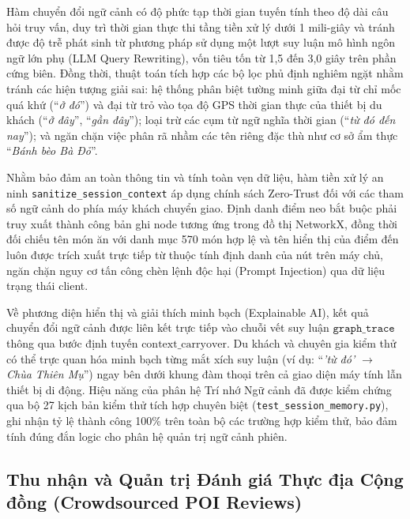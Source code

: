 Hàm chuyển đổi ngữ cảnh có độ phức tạp thời gian tuyến tính theo độ dài câu hỏi truy vấn, duy trì thời gian thực thi tầng tiền xử lý dưới 1 mili-giây và tránh được độ trễ phát sinh từ phương pháp sử dụng một lượt suy luận mô hình ngôn ngữ lớn phụ (LLM Query Rewriting), vốn tiêu tốn từ 1,5 đến 3,0 giây trên phần cứng biên. Đồng thời, thuật toán tích hợp các bộ lọc phủ định nghiêm ngặt nhằm tránh các hiện tượng giải sai: hệ thống phân biệt tường minh giữa đại từ chỉ mốc quá khứ (``\textit{ở đó}'') và đại từ trỏ vào tọa độ GPS thời gian thực của thiết bị du khách (``\textit{ở đây}'', ``\textit{gần đây}''); loại trừ các cụm từ ngữ nghĩa thời gian (``\textit{từ đó đến nay}''); và ngăn chặn việc phân rã nhầm các tên riêng đặc thù như cơ sở ẩm thực ``\textit{Bánh bèo Bà Đỏ}''.

Nhằm bảo đảm an toàn thông tin và tính toàn vẹn dữ liệu, hàm tiền xử lý an ninh \texttt{sanitize\_\allowbreak session\_\allowbreak context} áp dụng chính sách Zero-Trust đối với các tham số ngữ cảnh do phía máy khách chuyển giao. Định danh điểm neo bắt buộc phải truy xuất thành công bản ghi node tương ứng trong đồ thị NetworkX, đồng thời đối chiếu tên món ăn với danh mục 570 món hợp lệ và tên hiển thị của điểm đến luôn được trích xuất trực tiếp từ thuộc tính định danh của nút trên máy chủ, ngăn chặn nguy cơ tấn công chèn lệnh độc hại (Prompt Injection) qua dữ liệu trạng thái client.

Về phương diện hiển thị và giải thích minh bạch (Explainable AI), kết quả chuyển đổi ngữ cảnh được liên kết trực tiếp vào chuỗi vết suy luận $\texttt{graph\_trace}$ thông qua bước định tuyến $\text{context\_carryover}$. Du khách và chuyên gia kiểm thử có thể trực quan hóa minh bạch từng mắt xích suy luận (ví dụ: ``\textit{'từ đó' $\to$ Chùa Thiên Mụ}'') ngay bên dưới khung đàm thoại trên cả giao diện máy tính lẫn thiết bị di động. Hiệu năng của phân hệ Trí nhớ Ngữ cảnh đã được kiểm chứng qua bộ 27 kịch bản kiểm thử tích hợp chuyên biệt (\texttt{test\_session\_memory.py}), ghi nhận tỷ lệ thành công 100\% trên toàn bộ các trường hợp kiểm thử, bảo đảm tính đúng đắn logic cho phân hệ quản trị ngữ cảnh phiên.

\subsection{Thu nhận và Quản trị Đánh giá Thực địa Cộng đồng (Crowdsourced POI Reviews)}
\label{subsec:ch1-crowdsourced-reviews}

